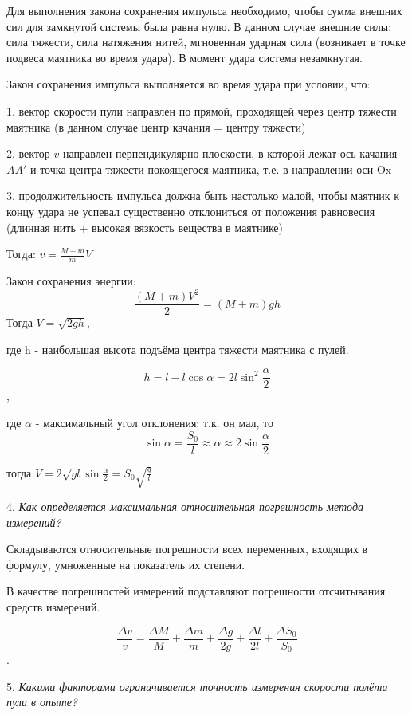 \documentclass[12pt, letterpaper]{article}
\begin{document}
Для выполнения закона сохранения импульса необходимо, чтобы сумма внешних сил для замкнутой системы была равна нулю. В данном случае внешние силы: сила тяжести, сила натяжения нитей, мгновенная ударная сила (возникает в точке подвеса маятника во время удара). В момент удара система незамкнутая.

Закон сохранения импульса выполняется во время удара при условии, что:

1. вектор скорости пули направлен по прямой, проходящей через центр тяжести маятника (в данном случае центр качания = центру тяжести)

2. вектор \(\overline{v}\) направлен перпендикулярно плоскости, в которой лежат ось качания \(AA'\) и точка центра тяжести покоящегося маятника, т.е. в направлении оси Ox

3. продолжительность импульса должна быть настолько малой, чтобы маятник к концу удара не успевал существенно отклониться от положения равновесия (длинная нить + высокая вязкость вещества в маятнике)

Тогда: \(v=\frac{M+m}{m}V\)

Закон сохранения энергии:
\[\frac{(M+m)V^2}{2}=(M+m)gh\]
Тогда \(V=\sqrt{2gh}\),

где h - наибольшая высота подъёма центра тяжести маятника с пулей.

\[h=l-l\cos \alpha =2l\sin^2 \frac{\alpha}{2}\],

где \(\alpha\) - максимальный угол отклонения; т.к. он мал, то
\[\sin \alpha = \frac{S_0}{l} \approx \alpha \approx 2 \sin \frac{\alpha}{2}\]

тогда \(V=2\sqrt{gl} \sin \frac{\alpha}{2} = S_0 \sqrt{\frac{g}{l}}\)\newline

4. \textit{Как определяется максимальная относительная погрешность метода измерений?}

Складываются относительные погрешности всех переменных, входящих в формулу, умноженные на показатель их степени.

В качестве погрешностей измерений подставляют погрешности отсчитывания средств измерений.

\[\frac{\Delta v}{v}=\frac{\Delta M}{M}+\frac{\Delta m}{m}+\frac{\Delta g}{2g}+\frac{\Delta l}{2l}+\frac{\Delta S_0}{S_0}\].\newline

5. \textit{Какими факторами ограничивается точность измерения скорости полёта пули в опыте?}
\end{document}

